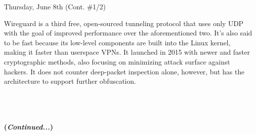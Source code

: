 \documentclass[11pt]{article}
\begin{document}
\begin{orangebox}{Thursday, June 8th (Cont. \#1/2)\vspace{-2.2em}\begin{flushright}\end{flushright}}
\begin{itemize}
    \phantom{~~~~} Wireguard is a third free, open-sourced tunneling protocol that uses only UDP with the goal of improved performance over the aforementioned two. It's also said to be fast because its low-level components are built into the Linux kernel, making it faster than userspace VPNs. It launched in 2015 with newer and faster cryptographic methods, also focusing on minimizing attack surface against hackers. It does not counter deep-packet inspection alone, however, but has the architecture to support further obfuscation.
\end{itemize}
    \begin{center}
    \vspace{-0.5em}
    \large\bullet \\
    \large\bullet \\
    \large\bullet \\
    \Large\textbf{(\textit{Continued...})}
    \end{center}
\end{orangebox}
\end{document}

